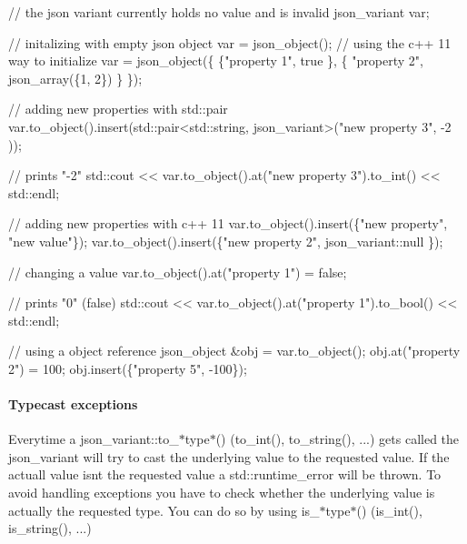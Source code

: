 \begin{DoxyCode}
\textcolor{comment}{// the json variant currently holds no value and is invalid}
json\_variant var; 

\textcolor{comment}{// initalizing with empty json object}
var = json\_object();
\textcolor{comment}{// using the c++ 11 way to initialize}
var = json\_object(\{ \{\textcolor{stringliteral}{"property 1"}, \textcolor{keyword}{true} \}, \{ \textcolor{stringliteral}{"property 2"}, json\_array(\{1, 2\}) \} \}); 

\textcolor{comment}{// adding new properties with std::pair}
var.to\_object().insert(std::pair<std::string, json\_variant>(\textcolor{stringliteral}{"new property 3"}, -2 ));

\textcolor{comment}{// prints "-2"}
std::cout << var.to\_object().at(\textcolor{stringliteral}{"new property 3"}).to\_int() << std::endl; 

\textcolor{comment}{// adding new properties with c++ 11}
var.to\_object().insert(\{\textcolor{stringliteral}{"new property"}, \textcolor{stringliteral}{"new value"}\});
var.to\_object().insert(\{\textcolor{stringliteral}{"new property 2"}, json\_variant::null \});

\textcolor{comment}{// changing a value}
var.to\_object().at(\textcolor{stringliteral}{"property 1"}) = \textcolor{keyword}{false};

\textcolor{comment}{// prints "0" (false)}
std::cout << var.to\_object().at(\textcolor{stringliteral}{"property 1"}).to\_bool() << std::endl; 

\textcolor{comment}{// using a object reference}
json\_object &obj = var.to\_object();
obj.at(\textcolor{stringliteral}{"property 2"}) = 100;
obj.insert(\{\textcolor{stringliteral}{"property 5"}, -100\});
\end{DoxyCode}


\paragraph*{\label{_typecast_exceptions_section}%
Typecast exceptions}

Everytime a {\ttfamily json\+\_\+variant\+::to\+\_\+$\ast$type$\ast$()} ({\ttfamily to\+\_\+int()}, {\ttfamily to\+\_\+string()}, ...) gets called the {\ttfamily json\+\_\+variant} will try to cast the underlying value to the requested value. If the actuall value isn\textquotesingle{}t the requested value a {\ttfamily std\+::runtime\+\_\+error} will be thrown. To avoid handling exceptions you have to check whether the underlying value is actually the requested type. You can do so by using {\ttfamily is\+\_\+$\ast$type$\ast$()} ({\ttfamily is\+\_\+int()}, {\ttfamily is\+\_\+string()}, ...)

